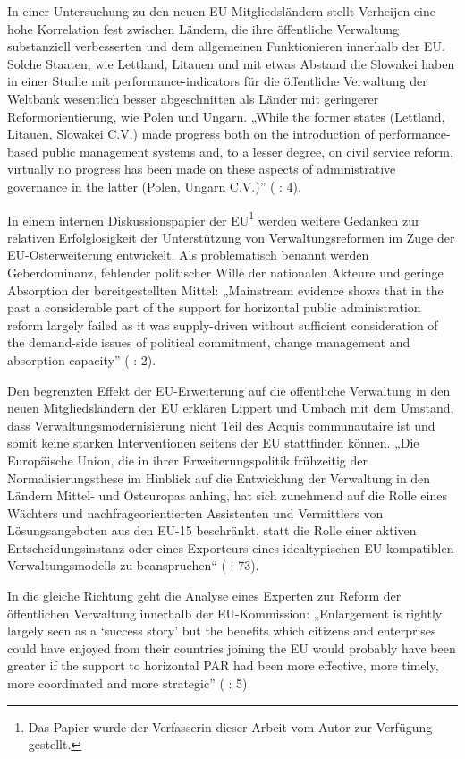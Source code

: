 In einer Untersuchung zu den neuen EU-Mitgliedsländern stellt Verheijen eine hohe Korrelation fest zwischen Ländern, die ihre öffentliche Verwaltung substanziell verbesserten und dem allgemeinen Funktionieren innerhalb der EU. Solche Staaten, wie Lettland, Litauen und mit etwas Abstand die Slowakei haben in einer Studie mit performance-indicators für die öffentliche Verwaltung der Weltbank wesentlich besser abgeschnitten als Länder mit geringerer Reformorientierung, wie Polen und Ungarn. „While the former states (Lettland, Litauen, Slowakei C.V.) made progress both on the introduction of performance-based public management systems and, to a lesser degree, on civil service reform, virtually no progress has been made on these aspects of administrative governance in the latter (Polen, Ungarn C.V.)” (\cite{verheijen09} : 4).\par
In einem internen Diskussionspapier der EU\footnote{Das Papier wurde der Verfasserin dieser Arbeit vom Autor zur Verfügung gestellt.} werden weitere Gedanken zur relativen Erfolglosigkeit der Unterstützung von Verwaltungsreformen im Zuge der EU-Osterweiterung entwickelt. Als problematisch benannt werden Geberdominanz, fehlender politischer Wille der nationalen Akteure und geringe Absorption der bereitgestellten Mittel: „Mainstream evidence shows that in the past a considerable part of the support for horizontal public administration reform largely failed as it was supply-driven without sufficient consideration of the demand-side issues of political commitment, change management and absorption capacity” (\cite{apelb07} : 2). \par
Den begrenzten Effekt der EU-Erweiterung auf die öffentliche Verwaltung in den neuen Mitgliedsländern der EU erklären Lippert und Umbach mit dem Umstand, dass Verwaltungsmodernisierung nicht Teil des Acquis communautaire ist und somit keine starken Interventionen seitens der EU stattfinden können. „Die Europäische Union, die in ihrer Erweiterungspolitik frühzeitig der Normalisierungsthese im Hinblick auf die Entwicklung der Verwaltung in den Ländern Mittel- und Osteuropas anhing, hat sich zunehmend auf die Rolle eines Wächters und nachfrageorientierten Assistenten und Vermittlers von Lösungsangeboten aus den EU-15 beschränkt, statt die Rolle einer aktiven Entscheidungsinstanz oder eines Exporteurs eines idealtypischen EU-kompatiblen Verwaltungsmodells zu beanspruchen“ (\cite{lipumb04} : 73).
\par
In die gleiche Richtung geht die Analyse eines Experten zur Reform der öffentlichen Verwaltung innerhalb der EU-Kommission: „Enlargement is rightly largely seen as a ‘success story’ but the benefits which citizens and enterprises could have enjoyed from their countries joining the EU would probably have been greater if the support to horizontal PAR had been more effective, more timely, more coordinated and more strategic” (\cite{apelb09} : 5).\par
